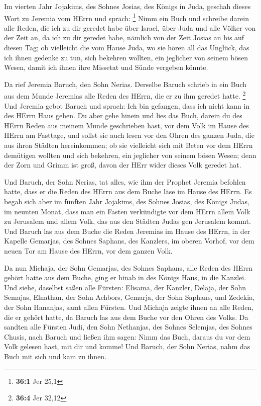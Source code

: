  Im vierten Jahr Jojakims, des Sohnes Josias, des Königs
in Juda, geschah dieses Wort zu Jeremia vom HErrn und sprach:
\footnote{\textbf{36:1} Jer 25,1}  Nimm ein Buch und
schreibe darein alle Reden, die ich zu dir geredet habe über Israel,
über Juda und alle Völker von der Zeit an, da ich zu dir geredet habe,
nämlich von der Zeit Josias an bis auf diesen Tag;  ob
vielleicht die vom Hause Juda, wo sie hören all das Unglück, das ich
ihnen gedenke zu tun, sich bekehren wollten, ein jeglicher von seinem
bösen Wesen, damit ich ihnen ihre Missetat und Sünde vergeben könnte.

 Da rief Jeremia Baruch, den Sohn Nerias. Derselbe Baruch
schrieb in ein Buch aus dem Munde Jeremias alle Reden des HErrn, die er
zu ihm geredet hatte. \footnote{\textbf{36:4} Jer 32,12} 
Und Jeremia gebot Baruch und sprach: Ich bin gefangen, dass ich nicht
kann in des HErrn Haus gehen.  Du aber gehe hinein und
lies das Buch, darein du des HErrn Reden aus meinem Munde geschrieben
hast, vor dem Volk im Hause des HErrn am Fasttage, und sollst sie auch
lesen vor den Ohren des ganzen Juda, die aus ihren Städten hereinkommen;
 ob sie vielleicht sich mit Beten vor dem HErrn demütigen
wollten und sich bekehren, ein jeglicher von seinem bösen Wesen; denn
der Zorn und Grimm ist groß, davon der HErr wider dieses Volk geredet
hat.

 Und Baruch, der Sohn Nerias, tat alles, wie ihm der
Prophet Jeremia befohlen hatte, dass er die Reden des HErrn aus dem
Buche läse im Hause des HErrn.  Es begab sich aber im
fünften Jahr Jojakims, des Sohnes Josias, des Königs Judas, im neunten
Monat, dass man ein Fasten verkündigte vor dem HErrn allem Volk zu
Jerusalem und allem Volk, das aus den Städten Judas gen Jerusalem kommt.
 Und Baruch las aus dem Buche die Reden Jeremias im Hause
des HErrn, in der Kapelle Gemarjas, des Sohnes Saphans, des Kanzlers, im
oberen Vorhof, vor dem neuen Tor am Hause des HErrn, vor dem ganzen
Volk.

 Da nun Michaja, der Sohn Gemarjas, des Sohnes Saphans,
alle Reden des HErrn gehört hatte aus dem Buche,  ging er
hinab in des Königs Haus, in die Kanzlei. Und siehe, daselbst saßen alle
Fürsten: Elisama, der Kanzler, Delaja, der Sohn Semajas, Elnathan, der
Sohn Achbors, Gemarja, der Sohn Saphans, und Zedekia, der Sohn Hananjas,
samt allen Fürsten.  Und Michaja zeigte ihnen an alle
Reden, die er gehört hatte, da Baruch las aus dem Buche vor den Ohren
des Volks.  Da sandten alle Fürsten Judi, den Sohn
Nethanjas, des Sohnes Selemjas, des Sohnes Chusis, nach Baruch und
ließen ihm sagen: Nimm das Buch, daraus du vor dem Volk gelesen hast,
mit dir und komme! Und Baruch, der Sohn Nerias, nahm das Buch mit sich
und kam zu ihnen.


